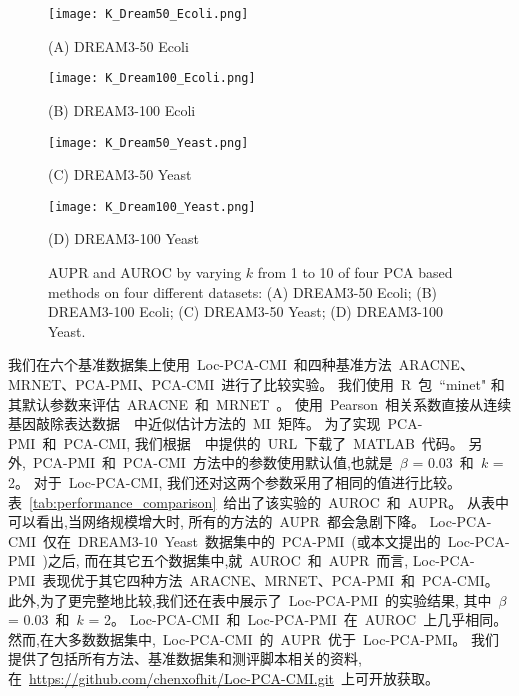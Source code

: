   \begin{figure*}[!htbp]
    \centering
    \begin{minipage}[b]{0.45\linewidth}
      \centering
      \centerline{
        \texttt{[image: K\_Dream50\_Ecoli.png]}}
      \centerline{(A) DREAM3-50 Ecoli}
      \medskip  
    \end{minipage}
    \begin{minipage}[b]{0.45\linewidth}
      \centering
      \centerline{
        \texttt{[image: K\_Dream100\_Ecoli.png]}}
      \centerline{(B) DREAM3-100 Ecoli}
      \medskip  
    \end{minipage}
      \begin{minipage}[b]{0.45\linewidth}
      \centering
      \centerline{
        \texttt{[image: K\_Dream50\_Yeast.png]}}
      \centerline{(C) DREAM3-50 Yeast}
      \medskip  
    \end{minipage}
    \begin{minipage}[b]{0.45\linewidth}
      \centering
      \centerline{
        \texttt{[image: K\_Dream100\_Yeast.png]}}
      \centerline{(D) DREAM3-100 Yeast}
      \medskip  
    \end{minipage}
    \caption{AUPR and AUROC  by varying $k$ from 1 to 10 of four PCA based methods on four different datasets: 
    (A) DREAM3-50 Ecoli; 
    (B) DREAM3-100 Ecoli; 
    (C) DREAM3-50 Yeast; 
    (D) DREAM3-100 Yeast.}
    \label{fig:k}
    \vspace{-0.5em}
  \end{figure*}

我们在六个基准数据集上使用~Loc-PCA-CMI~和四种基准方法~ARACNE、MRNET、PCA-PMI、PCA-CMI~进行了比较实验。
我们使用~R~包~``minet" 和其默认参数来评估~ARACNE~和~MRNET~\cite{meyer2008minet}。
使用~Pearson~相关系数直接从连续基因敲除表达数据~\cite{olsen2008impact,meyer2010information}~中近似估计方法的~MI~矩阵。
为了实现~PCA-PMI~和~PCA-CMI, 我们根据~\cite{zhang2011inferring,zhao2016part}~中提供的~URL~下载了~MATLAB~代码。
另外,~PCA-PMI~和~PCA-CMI~方法中的参数使用默认值,也就是~$\beta$ = 0.03~和~$k$ = 2。
对于~Loc-PCA-CMI, 我们还对这两个参数采用了相同的值进行比较。
表~\ref{tab:performance_comparison}~给出了该实验的~AUROC~和~AUPR。
从表中可以看出,当网络规模增大时, 所有的方法的~AUPR~都会急剧下降。
Loc-PCA-CMI~仅在~DREAM3-10~Yeast~数据集中的~PCA-PMI~(或本文提出的~Loc-PCA-PMI~)之后,
而在其它五个数据集中,就~AUROC~和~AUPR~而言,
Loc-PCA-PMI~表现优于其它四种方法~ARACNE、MRNET、PCA-PMI~和~PCA-CMI。
此外,为了更完整地比较,我们还在表中展示了~Loc-PCA-PMI~的实验结果,
其中~$\beta$ = 0.03~和~$k$ = 2。
Loc-PCA-CMI~和~Loc-PCA-PMI~在~AUROC~上几乎相同。
然而,在大多数数据集中,~Loc-PCA-CMI~的~AUPR~优于~Loc-PCA-PMI。
我们提供了包括所有方法、基准数据集和测评脚本相关的资料, 
在~\url{https://github.com/chenxofhit/Loc-PCA-CMI.git}~上可开放获取。

